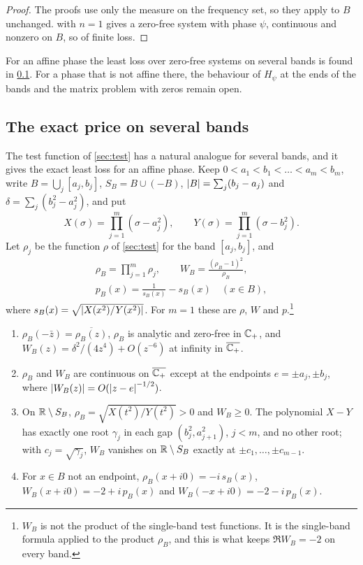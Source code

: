 \begin{proof}
The proofs use only the measure on the frequency set, so they apply to $B$
unchanged.  with $n=1$ gives a zero-free system with phase
$\psi$, continuous and nonzero on $B$, so of finite loss.
\end{proof}

For an affine phase the least loss over zero-free systems on several bands
is found in \cref{ssec:severalexact}. For a phase that is not affine there,
the behaviour of $H_\psi$ at the ends of the bands and the matrix problem with
zeros remain open.

\subsection{The exact price on several bands}\label{ssec:severalexact}

The test function of \cref{sec:test} has a natural analogue for several
bands, and it gives the exact least loss for an affine phase. Keep
$0<a_1<b_1<\dots<a_m<b_m$, write $B=\bigcup_j[a_j,b_j]$, $S_B=B\cup(-B)$,
$\left|B\right|=\sum_j(b_j-a_j)$ and $\delta=\sum_j(b_j^2-a_j^2)$, and put
\[
X(\sigma)=\prod_{j=1}^m(\sigma-a_j^2),\qquad Y(\sigma)=\prod_{j=1}^m(\sigma-b_j^2).
\]
Let $\rho_j$ be the function $\rho$ of \cref{sec:test} for the band
$[a_j,b_j]$, and
\begin{gather*}
\rho_B=\prod_{j=1}^m\rho_j,\qquad W_B=\frac{(\rho_B-1)^2}{\rho_B},\\
p_B(x)=\frac1{s_B(x)}-s_B(x)\quad(x\in B),
\end{gather*}
where $s_B(x)=\sqrt{\left|X(x^2)/Y(x^2)\right|}$. For $m=1$ these are $\rho$, $W$
and $p$.\footnote{$W_B$ is not the product of the single-band test
functions. It is the single-band formula applied to the product $\rho_B$,
and this is what keeps $\Re W_B=-2$ on every band.}

\begin{lemma}\label{lem:WB}
\begin{enumerate}
\item[(i)] $\rho_B(-\bar z)=\overline{\rho_B(z)}$, $\rho_B$ is analytic and
zero-free in $\mathbb C_{+}$, and $W_B(z)=\delta^2/(4z^4)+O(z^{-6})$ at infinity in
$\overline{\mathbb C_{+}}$.
\item[(ii)] $\rho_B$ and $W_B$ are continuous on $\overline{\mathbb C_{+}}$ except at
the endpoints $e=\pm a_j,\pm b_j$, where $\left|W_B(z)\right|=O(\left|z-e\right|^{-1/2})$.
\item[(iii)] On $\mathbb R\setminus S_B$, $\rho_B=\sqrt{X(t^2)/Y(t^2)}>0$ and
$W_B\ge0$. The polynomial $X-Y$ has exactly one root $\gamma_j$ in each gap
$(b_j^2,a_{j+1}^2)$, $j<m$, and no other root; with $c_j=\sqrt{\gamma_j}$,
$W_B$ vanishes on $\mathbb R\setminus S_B$ exactly at $\pm c_1,\dots,\pm c_{m-1}$.
\item[(iv)] For $x\in B$ not an endpoint, $\rho_B(x+i0)=-i\,s_B(x)$,
$W_B(x+i0)=-2+i\,p_B(x)$ and $W_B(-x+i0)=-2-i\,p_B(x)$.
\end{enumerate}
\end{lemma}

